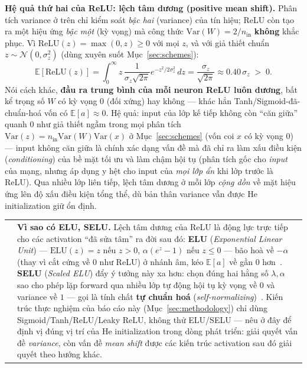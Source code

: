 \documentclass[12pt,a4paper]{report}
\makeatletter
\newenvironment{tructiep}[1][Cách hiểu đơn giản]
  {\par\smallskip\noindent\begin{tabular}{@{}p{0.35em}@{\hspace{6pt}}p{\dimexpr\linewidth-1.9em\relax}@{}}
   \textcolor{boxln}{\rule{2pt}{\baselineskip}} & \textbf{#1.}\enspace\ignorespaces}
  {\end{tabular}\par\smallskip}
\newcommand{\en}[1]{\textit{#1}}
\makeatother
\begin{document}
\textbf{Hệ quả thứ hai của ReLU: lệch tâm dương (positive mean shift).}
Phân tích variance ở trên chỉ kiểm soát \emph{bậc hai} (variance) của tín
hiệu; ReLU còn tạo ra một hiệu ứng \emph{bậc một} (kỳ vọng) mà công thức
$\mathrm{Var}(W)=2/n_{\text{in}}$ \textbf{không} khắc phục. Vì
$\mathrm{ReLU}(z)=\max(0,z)\ge0$ với mọi $z$, và với giả thiết chuẩn
$z\sim\mathcal N(0,\sigma_z^2)$ (dùng xuyên suốt Mục~\ref{sec:schemes}):
$$\mathbb E[\mathrm{ReLU}(z)] = \int_0^\infty z\,\frac{1}{\sigma_z\sqrt{2\pi}}e^{-z^2/2\sigma_z^2}\,dz = \frac{\sigma_z}{\sqrt{2\pi}} \approx 0.40\,\sigma_z \;>\;0.$$
Nói cách khác, \textbf{đầu ra trung bình của mỗi neuron ReLU luôn dương},
bất kể trọng số $W$ có kỳ vọng $0$ (đối xứng) hay không --- khác hẳn
Tanh/Sigmoid-đã-chuẩn-hoá vốn có $\mathbb E[a]\approx0$. Hệ quả: input của
lớp kế tiếp không còn ``căn giữa'' quanh $0$ như giả thiết ngầm trong mọi
phân tích $\mathrm{Var}(z)=n_{\text{in}}\mathrm{Var}(W)\mathrm{Var}(x)$ ở
Mục~\ref{sec:schemes} (vốn coi $x$ có kỳ vọng $0$) --- input không căn
giữa là chính xác dạng vấn đề mà \citet{lecun1998efficient} đã chỉ ra làm
xấu điều kiện (\en{conditioning}) của bề mặt tối ưu và làm chậm hội tụ
(phân tích gốc cho \emph{input} của mạng, nhưng áp dụng y hệt cho input
của \emph{mọi lớp ẩn} khi lớp trước là ReLU). Qua nhiều lớp liên tiếp,
lệch tâm dương ở mỗi lớp \emph{cộng dồn} về mặt hiệu ứng lên độ xấu điều
kiện tổng thể, dù bản thân variance vẫn được He initialization giữ ổn
định.

\begin{tructiep}[Vì sao có ELU, SELU]
Lệch tâm dương của ReLU là động lực trực tiếp cho các activation ``đã sửa
tâm'' ra đời sau đó: \textbf{ELU} (\en{Exponential Linear Unit})
--- $\mathrm{ELU}(z)=z$ nếu $z>0$, $\alpha(e^z-1)$ nếu $z\le0$
--- bão hoà về $-\alpha$ (thay vì cắt cứng về $0$ như ReLU) ở nhánh âm,
kéo $\mathbb E[a]$ về gần $0$ hơn~\citep{clevert2016elu}. \textbf{SELU}
(\en{Scaled ELU}) đẩy ý tưởng này xa hơn: chọn đúng hai hằng số
$\lambda,\alpha$ sao cho phép lặp forward qua nhiều lớp tự động hội tụ
kỳ vọng về $0$ và variance về $1$ --- gọi là tính chất
\textbf{tự chuẩn hoá} (\en{self-normalizing})~\citep{klambauer2017selu}.
Kiến trúc thực nghiệm của báo cáo này (Mục~\ref{sec:methodology}) chỉ
dùng Sigmoid/Tanh/ReLU/Leaky ReLU, không thử ELU/SELU --- nêu ở đây để
định vị đúng vị trí của He initialization trong dòng phát triển: giải
quyết vấn đề \emph{variance}, còn vấn đề \emph{mean shift} được các kiến
trúc activation sau đó giải quyết theo hướng khác.
\end{tructiep}
\end{document}
